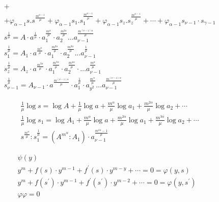\documentclass{article}
\begin{document}
\[\begin{aligned}
& + \\
& +\varphi_{\alpha-1} s . s^{\frac{m^{\alpha-1}}{\mu}}+\varphi_{\alpha-1} s_{1} . s_{1}^{\frac{m^{\alpha-1}}{\mu}}+\varphi_{\alpha-1} s_{z} . s_{z}^{\frac{m^{\alpha-1}}{\mu}}+\cdots+\varphi_{\alpha-1} s_{\nu-1} \cdot s_{\gamma-1} \\
& s^{\frac{1}{\mu}}=A \cdot a^{\frac{1}{\mu}} \cdot a_{1}^{\frac{m^{\alpha}}{\mu}} \cdot a_{2}^{\frac{m^{2 \alpha}}{\mu}} \ldots a_{\nu-1}^{\frac{m^{(\nu-1) \alpha}}{\mu}} \\
& s_{1}^{\frac{1}{\mu}}=A_{1} \cdot a^{\frac{m^{\alpha}}{\mu}} \cdot a_{1}^{\frac{m^{2 \alpha}}{\mu}} \cdot a_{2}^{\frac{m^{3 \alpha}}{\mu}} \ldots a_{\nu-1}^{\frac{1}{\mu}} \\
& s_{z}^{\frac{1}{\mu}}=A_{z} \cdot a^{\frac{m^{2 \alpha}}{\mu}} \cdot a_{1}^{\frac{m^{3 \alpha}}{\mu}} \cdot a_{2}^{\frac{m^{4 \alpha}}{\mu}} \cdot \ldots a_{\nu-1}^{\frac{m^{\alpha}}{\mu}} \\
& s_{\nu-1}^{\frac{1}{\mu}}=A_{\nu-1} \cdot a^{\frac{m^{(\nu-1) \alpha}}{\mu}} \cdot a_{1}^{\frac{1}{\mu}} \cdot a_{y^{2}}^{\frac{m^{\alpha}}{\mu}} \ldots a_{\nu-1}^{\frac{m^{(\nu-4) \alpha}}{\mu}}
\end{aligned}
\]

\[
\begin{aligned}
& \frac{1}{\mu} \log s=\log A+\frac{1}{\mu} \log a+\frac{m^{\alpha}}{\mu} \log a_{1}+\frac{m^{2 \alpha}}{\mu} \log a_{2}+\cdots \\
& \frac{1}{\mu} \log s_{1}=\log A_{1}+\frac{m^{\alpha}}{\mu} \log a+\frac{m^{2 \alpha}}{\mu} \log a_{1}+\frac{m^{3 \alpha}}{\mu} \log a_{2}+\cdots \\
& s^{\frac{m^{\alpha}}{\mu}}: s_{1}^{\frac{1}{\mu}}=\left(A^{m^{\alpha}}: A_{1}\right) \cdot a_{\nu-1}^{\frac{m^{\nu \alpha}-1}{\mu}}
\end{aligned}
\]

\[
\begin{gathered}
\psi(y) \\
y^{m}+f(s) \cdot y^{m-1}+f^{\prime}(s) \cdot y^{m-y}+\cdots=0=\varphi(y, s) \\
y^{m}+f\left(s^{\prime}\right) \cdot y^{m-1}+f^{\prime}\left(s^{\prime}\right) \cdot y^{m-2}+\cdots=0=\varphi\left(y, s^{\prime}\right) \\
\varphi \varphi=0
\end{gathered}
\]
\end{document}

